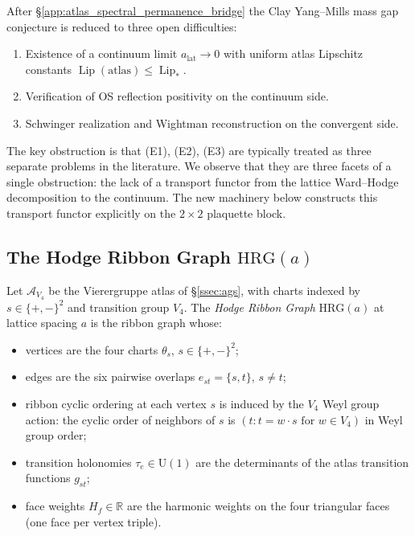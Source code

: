 After \S\ref{app:atlas_spectral_permanence_bridge} the Clay Yang--Mills
mass gap conjecture is reduced to three open difficulties:
\begin{enumerate}
\item[(E1)] Existence of a continuum limit $a_{\mathrm{lat}}\to 0$ with
  uniform atlas Lipschitz constants
  $\operatorname{Lip}(\mathrm{atlas})\le\operatorname{Lip}_{*}$.
\item[(E2)] Verification of OS reflection positivity on the continuum
  side.
\item[(E3)] Schwinger realization and Wightman reconstruction on the
  convergent side.
\end{enumerate}
The key obstruction is that (E1), (E2), (E3) are typically treated as
three separate problems in the literature. We observe that they are
three facets of a single obstruction: the lack of a transport functor
from the lattice Ward--Hodge decomposition to the continuum. The new
machinery below constructs this transport functor explicitly on the
$2\times 2$ plaquette block.

\subsection{The Hodge Ribbon Graph $\mathrm{HRG}(a)$}
\label{ssec:hrg}

\begin{definition}
\label{def:hrg}
Let $\mathcal{A}_{V_{4}}$ be the Vierergruppe atlas of
\S\ref{ssec:ags}, with charts indexed by
$s\in\{+,-\}^{2}$ and transition group $V_{4}$. The \emph{Hodge Ribbon
Graph} $\mathrm{HRG}(a)$ at lattice spacing $a$ is the ribbon graph
whose:
\begin{itemize}
\item vertices are the four charts $\theta_{s}$, $s\in\{+,-\}^{2}$;
\item edges are the six pairwise overlaps
  $e_{st}=\{s,t\}$, $s\neq t$;
\item ribbon cyclic ordering at each vertex $s$ is induced by the
  $V_{4}$ Weyl group action: the cyclic order of neighbors of $s$ is
  $(t:t=w\cdot s\text{ for }w\in V_{4})$ in Weyl group order;
\item transition holonomies $\tau_{e}\in\mathrm{U}(1)$ are the
  determinants of the atlas transition functions $g_{st}$;
\item face weights $H_{f}\in\mathbb{R}$ are the harmonic weights on
  the four triangular faces (one face per vertex triple).
\end{itemize}
\end{definition}

